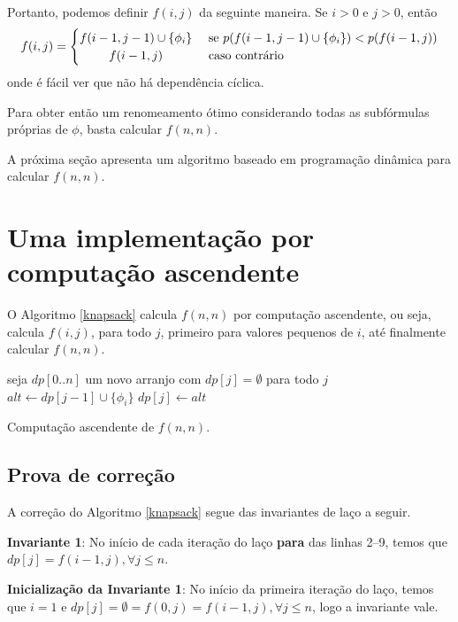 Portanto, podemos definir $f(i,j)$ da seguinte maneira. Se $i > 0$ e $j > 0$, então
\[
f(i,j) =
\begin{cases} 
\hfill f(i-1,j-1) \cup \{\phi_i \}   \hfill & \text{ se } p(f(i-1,j-1) \cup \{\phi_i \}) < p(f(i-1,j)) \\
\hfill f(i-1,j) \hfill & \text{ caso contrário} \\
\end{cases}
\]
onde é fácil ver que não há dependência cíclica.

Para obter então um renomeamento ótimo considerando todas as subfórmulas próprias de $\phi$, basta calcular $f(n,n)$.

A próxima seção apresenta um algoritmo baseado em programação dinâmica \cite{bellman2015applied} para calcular $f(n,n)$.

\section{Uma implementação por computação ascendente}

\indent

O Algoritmo \ref{knapsack} calcula $f(n,n)$ por computação ascendente, ou seja, calcula $f(i,j)$, para todo $j$, primeiro para valores pequenos de $i$, até finalmente calcular $f(n,n)$.

\begin{algorithm}
	\begin{algorithmic}[1]
		\State seja $dp[0..n]$ um novo arranjo com $dp[j] = \emptyset$ para todo $j$
				\State $alt \gets dp[j-1] \cup \{\phi_i\}$
					\State $dp[j] \gets alt$
				\EndIf
			\EndFor
		\EndFor
	\end{algorithmic}
	\caption{Computação ascendente de $f(n,n)$.}
	\label{knapsack}
\end{algorithm}

\subsection{Prova de correção}

\indent

A correção do Algoritmo \ref{knapsack} segue das invariantes de laço a seguir.

\textbf{Invariante 1}: No início de cada iteração do laço \textbf{para} das linhas 2--9, temos que $dp[j] = f(i-1,j), \forall j \leq n$.

\textbf{Inicialização da Invariante 1}: No início da primeira iteração do laço, temos que $i = 1$ e $dp[j] = \emptyset = f(0,j) = f(i-1,j), \forall j \leq n$, logo a invariante vale.


